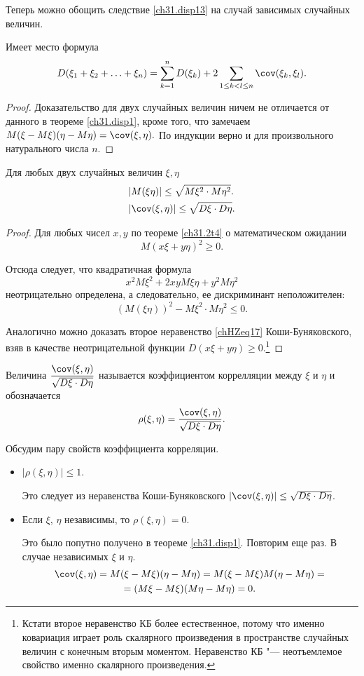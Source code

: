 Теперь можно обощить следствие \ref{ch31.disp13} на случай зависимых случайных величин.
\begin{thm}
Имеет место формула
$$
D(\xi_1 + \xi_2 + \ldots + \xi_n) = \sum\limits_{k=1}^{n} D(\xi_k) + 2 \sum\limits_{1\le k < l \le n} \cov (\xi_k,\xi_l).
$$
\end{thm}
\begin{proof}
Доказательство для двух случайных величин ничем не отличается от данного в теореме \ref{ch31.disp1}, кроме того, что замечаем  $M(\xi - M\xi)(\eta - M\eta)=\cov (\xi,\eta).$ По индукции верно и для произвольного натурального числа $n$.
\end{proof}
\begin{thm}
Для любых двух случайных величин $\xi, \eta$
\begin{align}
&|M(\xi\eta)| \le \sqrt{M\xi^2 \cdot M\eta^2}.\\
&|\cov(\xi,\eta)| \le \sqrt{D\xi\cdot D\eta}.\label{chHZeq17}
\end{align}
\end{thm}
\begin{proof}
Для любых чисел $x, y$ по теореме \ref{ch31.2t4} о математическом ожидании 
$$
M(x\xi + y\eta)^2 \ge 0.
$$

Отсюда следует, что квадратичная формула
$$
x^2M\xi^2 + 2xyM\xi\eta + y^2M\eta^2
$$
неотрицательно определена, а следовательно, ее дискриминант неположителен:
$$
(M(\xi\eta))^2 - M\xi^2 \cdot M\eta^2 \le 0.
$$

Аналогично можно доказать второе неравенство \eqref{chHZeq17} Коши-Буняковского, взяв в качестве неотрицательной функции $D(x\xi + y\eta)\ge 0$.\footnote{Кстати второе неравенство КБ более естественное, потому что именно ковариация играет роль скалярного произведения в пространстве случайных величин с конечным вторым моментом. Неравенство КБ "--- неотъемлемое свойство именно скалярного произведения.}
\end{proof}

\begin{defn}
Величина $\displaystyle\frac{\cov(\xi,\eta)}{\sqrt{D\xi\cdot D\eta}}$ называется коэффициентом коррелляции между $\xi$ и $\eta$  и обозначается $$\rho (\xi,\eta) = \frac{\cov(\xi,\eta)}{\sqrt{D\xi\cdot D\eta}}.$$
\end{defn}

Обсудим пару свойств коэффициента корреляции.
\begin{itemize}
\item 
$|\rho(\xi,\eta)|\le1$.

Это следует из неравенства Коши-Буняковского $|\cov(\xi,\eta)| \le \sqrt{D\xi\cdot D\eta}$.
\item
Если $\xi$, $\eta$ независимы, то $\rho(\xi,\eta)=0$.

Это было попутно получено в теореме \ref{ch31.disp1}. Повторим еще раз. В случае независимых $\xi$ и $\eta$.
\begin{multline*}
\cov(\xi,\eta)=M(\xi - M\xi)(\eta - M\eta) = M(\xi - M\xi)M(\eta - M\eta)=\\ = (M\xi - M\xi)(M\eta - M\eta) = 0.
\end{multline*}
\end{itemize}